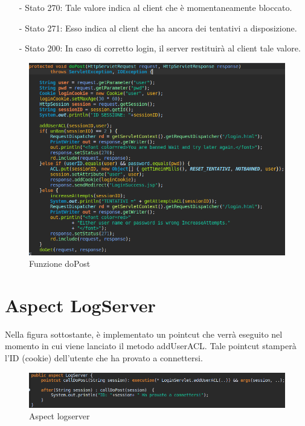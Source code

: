 \documentclass[a4paper,12pt,titlepage,oneside,openany]{book}
\begin{document}
\begin{itemize}
	\item[-] Stato 270: Tale valore indica al client che è momentaneamente bloccato.
	\item[-] Stato 271: Esso indica al client che ha ancora dei tentativi a disposizione.
	\item[-] Stato 200: In caso di corretto login, il server restituirà al client tale valore.
\end{itemize}
\begin{figure}[H]
	\centering
	\includegraphics[scale=0.5]{dopost.png}
	\caption{Funzione doPost}
	\label{fig:dopost}
\end{figure}
\section{Aspect LogServer}
Nella figura sottostante, è implementato un pointcut che verrà eseguito nel momento in cui viene lanciato il metodo addUserACL. Tale pointcut stamperà l'ID (cookie) dell'utente che ha provato a connettersi.
\begin{figure}[H]
	\centering
	\includegraphics[scale=0.5]{logserver.png}
	\caption{Aspect logserver}
	\label{fig:logserver}
\end{figure}
\end{document}
